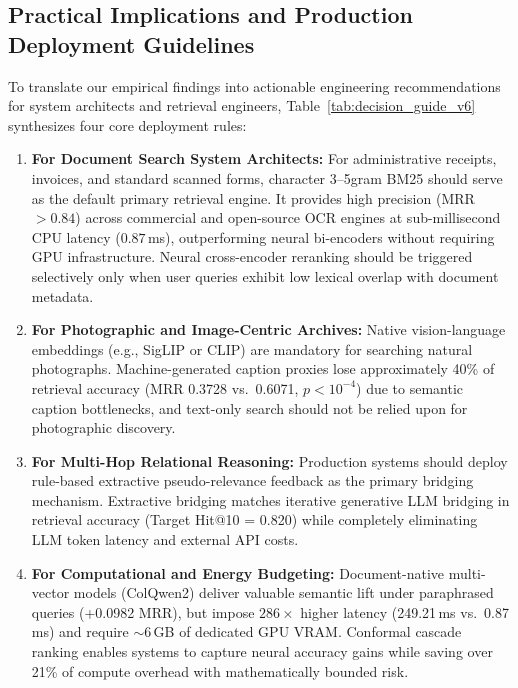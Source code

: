 \documentclass[conference]{IEEEtran}
\begin{document}
\subsection{Practical Implications and Production Deployment Guidelines}
\label{sec:practical_implications}
To translate our empirical findings into actionable engineering recommendations for system architects and retrieval engineers, Table~\ref{tab:decision_guide_v6} synthesizes four core deployment rules:
\begin{enumerate}
    \setlength{\itemsep}{1pt plus 0.5pt}
    \setlength{\parskip}{0pt}
    \item \textbf{For Document Search System Architects:} For administrative receipts, invoices, and standard scanned forms, character 3--5gram BM25 should serve as the default primary retrieval engine. It provides high precision (MRR $> 0.84$) across commercial and open-source OCR engines at sub-millisecond CPU latency ($0.87$\,ms), outperforming neural bi-encoders without requiring GPU infrastructure. Neural cross-encoder reranking should be triggered selectively only when user queries exhibit low lexical overlap with document metadata.
    \item \textbf{For Photographic and Image-Centric Archives:} Native vision-language embeddings (e.g., SigLIP or CLIP) are mandatory for searching natural photographs. Machine-generated caption proxies lose approximately 40\% of retrieval accuracy (MRR 0.3728 vs.\ 0.6071, $p < 10^{-4}$) due to semantic caption bottlenecks, and text-only search should not be relied upon for photographic discovery.
    \item \textbf{For Multi-Hop Relational Reasoning:} Production systems should deploy rule-based extractive pseudo-relevance feedback as the primary bridging mechanism. Extractive bridging matches iterative generative LLM bridging in retrieval accuracy (Target Hit@10 = 0.820) while completely eliminating LLM token latency and external API costs.
    \item \textbf{For Computational and Energy Budgeting:} Document-native multi-vector models (ColQwen2) deliver valuable semantic lift under paraphrased queries (+0.0982 MRR), but impose $286\times$ higher latency (249.21\,ms vs.\ 0.87\,ms) and require $\sim$6\,GB of dedicated GPU VRAM. Conformal cascade ranking enables systems to capture neural accuracy gains while saving over 21\% of compute overhead with mathematically bounded risk.
\end{enumerate}
\end{document}
